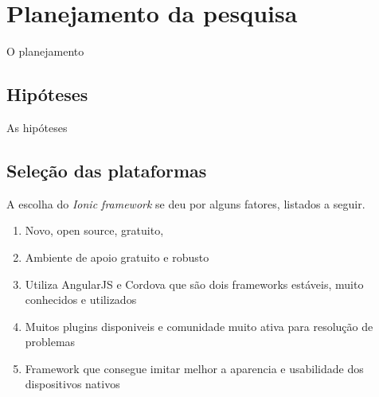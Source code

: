 \begin{comment}
Texto introdutório da seção -> Precisa?
ok - projeto feito com tais condicoes de equipe, tempo e equipamento
ok - agora vai ser feito com tais nova condicoes de equipe, tempo e equipamento
ok - pouco conhecimento em html, css e javascript
ok - pq o uso do mini farma, pq o código eh nosso, app pequeno, mas que usa varios recursos nativos do celular
ok - pq o uso do ionic e nao de outra, criterios de escolha
será que aqui fala das versoes do ios, ionic, cordova, angularjs? sim e explicar pq nao escolheu a versao 2 do ionic, pq eh recente e estavel
\end{comment}

\section{Planejamento da pesquisa} \label{sec:planejamento}

O planejamento

\subsection{Hipóteses} \label{subsec:hipoteses}

As hipóteses

\subsection{Seleção das plataformas} \label{subsec:selecaodasplataformas}

A escolha do \textit{Ionic framework} se deu por alguns fatores, listados a seguir. 
\begin{enumerate}
    \item Novo, open source, gratuito,
    \item Ambiente de apoio gratuito e robusto
    \item Utiliza AngularJS e Cordova que são dois frameworks estáveis, muito conhecidos e utilizados
    \item Muitos plugins disponiveis e comunidade muito ativa para resolução de problemas %
    \item Framework que consegue imitar melhor a aparencia e usabilidade dos dispositivos nativos %
\end{enumerate}
 
\begin{comment}
Porque Ionic? Porque não, outro? Quais os criterios usados para escolher o Ionic?
Ionic é open source, gratuito, muito focado em performance e possui html e css otimizados para dispositivos móveis.
\end{comment}


